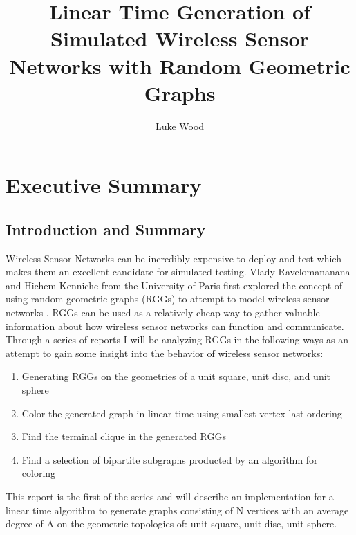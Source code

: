 \documentclass{article}
\begin{document}
  \title{Linear Time Generation of Simulated Wireless Sensor Networks with Random Geometric Graphs}
  \author{Luke Wood}
  \maketitle

  \section{Executive Summary}
  \subsection{Introduction and Summary}
	Wireless Sensor Networks can be incredibly expensive to deploy and test which makes them an excellent candidate for simulated testing.
	Vlady Ravelomananana and Hichem Kenniche from the University of Paris first explored the concept of using random geometric graphs (RGGs) to attempt to model wireless sensor networks \cite{kenniche2010random}.
	RGGs can be used as a relatively cheap way to gather valuable information about how wireless sensor networks can function and communicate.
	Through a series of reports	I will be analyzing RGGs in the following ways as an attempt to gain some insight into the behavior of wireless sensor networks:
	\begin{enumerate}
		\item Generating RGGs on the geometries of a unit square, unit disc, and unit sphere
		\item Color the generated graph in linear time using smallest vertex last ordering
		\item Find the terminal clique in the generated RGGs
		\item Find a selection of bipartite subgraphs producted by an algorithm for coloring
	\end{enumerate}
	This report is the first of the series and  will describe an implementation for a linear time algorithm to generate graphs consisting of N vertices with an average degree of A on the geometric topologies of: unit square, unit disc, unit sphere.
\end{document}
